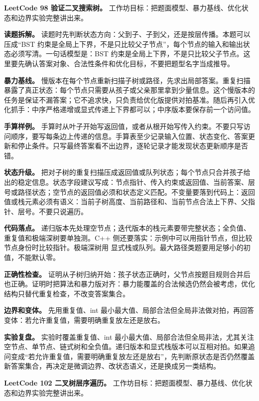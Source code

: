 \noindent\textbf{LeetCode 98 验证二叉搜索树。} 工作坊目标：把题面模型、暴力基线、优化状态和边界实验完整讲出来。

\textbf{读题拆解。} 读题时先判断状态方向：父到子、子到父，还是按层传播。本题可以压成“BST 约束是全局上下界，不是只比较父子节点”，每个节点的输入和输出状态必须写清。一句话模型是：BST 约束是全局上下界，不是只比较父子节点。这里要先确认答案对象、合法性条件和优化目标，不要把题型名字当成推导。

\textbf{暴力基线。} 慢版本在每个节点重新扫描子树或路径，先求出局部答案。重复扫描暴露了真正状态：每个节点只需要从孩子或父亲那里拿到少量信息。这个慢版本的任务是保证不漏答案；它不追求快，只负责给优化版提供对拍基准。随后再引入优化抓手：中序严格递增或显式传递上下界都可以；中序版本要保存前一个访问值。

\textbf{手算样例。} 手算时从叶子开始写返回值，或者从根开始写传入约束。不要只写访问顺序，要写每条边上传递的信息。手算表至少记录输入位置、状态变化、答案更新和停止条件。只写最终答案看不出边界，逐轮记录才能发现状态更新顺序是否错。

\textbf{状态升级。} 把对子树的重复扫描压成返回值或队列状态；每个节点只合并孩子给出的稳定信息。状态字段建议写成：节点指针、传入约束或返回值、当前答案、层号或路径状态；空节点的返回值必须和状态定义匹配。不变量要落到代码上：返回值或栈元素必须有语义：当前子树高度、当前路径和、当前节点合法上下界、父指针、层号。不要只说遍历。

\textbf{代码落点。} 递归版本先处理空节点；迭代版本的栈元素要带完整状态；全负值、重复值和极端深树要单独测。C++ 侧还要落实：示例中可以用指针节点，但比较节点身份时比较指针。极端深树用  显式栈或队列。最大路径类题要用足够小的初值，不能默认零。

\textbf{正确性检查。} 证明从子树归纳开始：孩子状态正确时，父节点按题目规则合并后也正确。证明时把算法和暴力版对齐：暴力能覆盖的合法候选仍然会被考虑，优化结构只替代重复检查，不改变答案集合。

\textbf{边界和变体。} 先用重复值、int 最小最大值、局部合法但全局非法做对拍，再回答变体：若允许重复值，需要明确重复放左还是放右。

\textbf{实验复盘。} 实验时覆盖重复值、int 最小最大值、局部合法但全局非法，尤其关注空节点、单节点、链式树和全负值。递归版本和显式栈版本可以互相对拍。如果追问变成“若允许重复值，需要明确重复放左还是放右”，先判断原状态是否仍然覆盖新答案集合，再决定是微调边界、改状态语义，还是换成另一类结构。

\noindent\textbf{LeetCode 102 二叉树层序遍历。} 工作坊目标：把题面模型、暴力基线、优化状态和边界实验完整讲出来。

